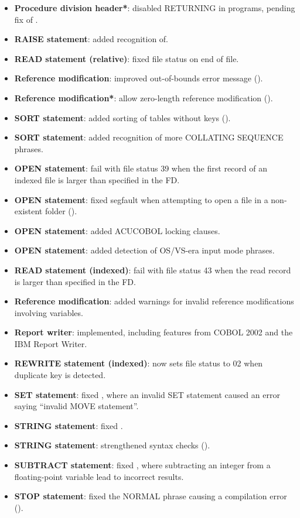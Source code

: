 \begin{itemize}
\item \textbf{Procedure division header*}: disabled RETURNING in programs, pending fix of .
\item \textbf{RAISE statement}: added recognition of.
\item \textbf{READ statement (relative)}: fixed file status on end of file.
\item \textbf{Reference modification}: improved out-of-bounds error message ().
\item \textbf{Reference modification*}: allow zero-length reference modification ().
\item \textbf{SORT statement}: added sorting of tables without keys ().
\item \textbf{SORT statement}: added recognition of more COLLATING SEQUENCE phrases.
\item \textbf{OPEN statement}: fail with file status 39 when the first record of an indexed file is larger than specified in the FD.
\item \textbf{OPEN statement}: fixed segfault when attempting to open a file in a non-existent folder ().
\item \textbf{OPEN statement}: added ACUCOBOL locking clauses.
\item \textbf{OPEN statement}: added detection of OS\slash{}VS-era input mode phrases.
\item \textbf{READ statement (indexed)}: fail with file status 43 when the read record is larger than specified in the FD.
\item \textbf{Reference modification}: added warnings for invalid reference modifications involving variables.
\item \textbf{Report writer}: implemented, including features from COBOL 2002 and the IBM Report Writer.
\item \textbf{REWRITE statement (indexed)}: now sets file status to 02 when duplicate key is detected.
\item \textbf{SET statement}: fixed , where an invalid SET statement caused an error saying ``invalid MOVE statement''.
\item \textbf{STRING statement}: fixed .
\item \textbf{STRING statement}: strengthened syntax checks ().
\item \textbf{SUBTRACT statement}: fixed , where subtracting an integer from a floating-point variable lead to incorrect results.
\item \textbf{STOP statement}: fixed the NORMAL phrase causing a compilation error ().

\end{itemize}
